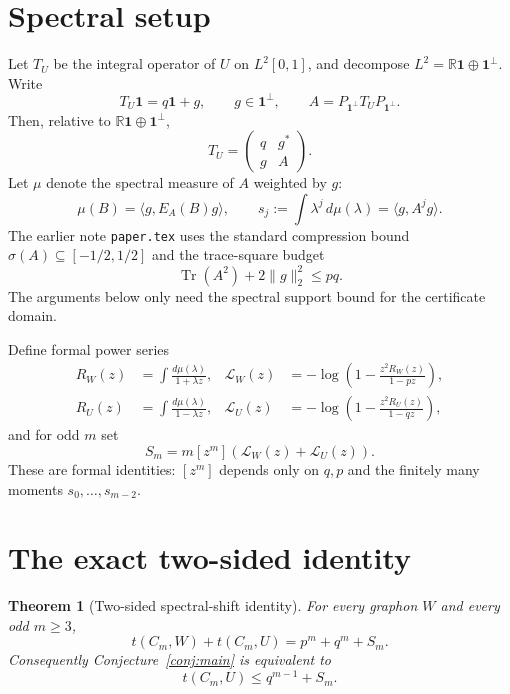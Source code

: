 \documentclass[11pt]{article}
\newtheorem{theorem}{Theorem}[section]
\newcommand{\one}{\mathbf 1}
\newcommand{\ip}[2]{\langle #1,#2\rangle}
\newcommand{\Tr}{\operatorname{Tr}}
\newcommand{\norm}[1]{\lVert #1\rVert}
\begin{document}
\section{Spectral setup}

Let $T_U$ be the integral operator of $U$ on $L^2[0,1]$, and decompose $L^2=\mathbb R\one\oplus\one^\perp$.  Write
\[
        T_U\one=q\one+g,
        \qquad g\in\one^\perp,
        \qquad A=P_{\one^\perp}T_UP_{\one^\perp}.
\]
Then, relative to $\mathbb R\one\oplus\one^\perp$,
\[
        T_U=\begin{pmatrix}q&g^*\\ g&A\end{pmatrix}.
\]
Let $\mu$ denote the spectral measure of $A$ weighted by $g$:
\[
        \mu(B)=\ip{g}{E_A(B)g},
        \qquad
        s_j:=\int \lambda^j\,d\mu(\lambda)=\ip{g}{A^jg}.
\]
The earlier note \texttt{paper.tex} uses the standard compression bound $\sigma(A)\subseteq[-1/2,1/2]$ and the trace-square budget
\[
        \Tr(A^2)+2\norm g_2^2\le pq.
\]
The arguments below only need the spectral support bound for the certificate domain.

Define formal power series
\begin{align}
        R_W(z)&=\int \frac{d\mu(\lambda)}{1+\lambda z},
        &
        \mathcal L_W(z)&=-\log\left(1-\frac{z^2R_W(z)}{1-pz}\right),\label{eq:LW}\\
        R_U(z)&=\int \frac{d\mu(\lambda)}{1-\lambda z},
        &
        \mathcal L_U(z)&=-\log\left(1-\frac{z^2R_U(z)}{1-qz}\right),\label{eq:LU}
\end{align}
and for odd $m$ set
\begin{equation}\label{eq:S-def}
        S_m=m[z^m](\mathcal L_W(z)+\mathcal L_U(z)).
\end{equation}
These are formal identities: $[z^m]$ depends only on $q,p$ and the finitely many moments $s_0,\ldots,s_{m-2}$.

\section{The exact two-sided identity}

\begin{theorem}[Two-sided spectral-shift identity]\label{thm:two-sided}
For every graphon $W$ and every odd $m\ge3$,
\begin{equation}\label{eq:two-sided}
        t(C_m,W)+t(C_m,U)=p^m+q^m+S_m.
\end{equation}
Consequently Conjecture~\ref{conj:main} is equivalent to
\begin{equation}\label{eq:equiv}
        t(C_m,U)\le q^{m-1}+S_m.
\end{equation}
\end{theorem}
\end{document}
